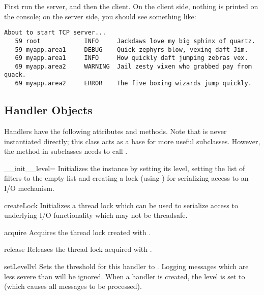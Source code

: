 First run the server, and then the client. On the client side, nothing is
printed on the console; on the server side, you should see something like:

\begin{verbatim}
About to start TCP server...
   59 root            INFO     Jackdaws love my big sphinx of quartz.
   59 myapp.area1     DEBUG    Quick zephyrs blow, vexing daft Jim.
   69 myapp.area1     INFO     How quickly daft jumping zebras vex.
   69 myapp.area2     WARNING  Jail zesty vixen who grabbed pay from quack.
   69 myapp.area2     ERROR    The five boxing wizards jump quickly.
\end{verbatim}

\subsection{Handler Objects}

Handlers have the following attributes and methods. Note that
 is never instantiated directly; this class acts as a
base for more useful subclasses. However, the 
method in subclasses needs to call .

\begin{methoddesc}{__init__}{level=}
Initializes the  instance by setting its level, setting
the list of filters to the empty list and creating a lock (using
) for serializing access to an I/O mechanism.
\end{methoddesc}

\begin{methoddesc}{createLock}{}
Initializes a thread lock which can be used to serialize access to
underlying I/O functionality which may not be threadsafe.
\end{methoddesc}

\begin{methoddesc}{acquire}{}
Acquires the thread lock created with .
\end{methoddesc}

\begin{methoddesc}{release}{}
Releases the thread lock acquired with .
\end{methoddesc}

\begin{methoddesc}{setLevel}{lvl}
Sets the threshold for this handler to . Logging messages which are
less severe than  will be ignored. When a handler is created, the
level is set to  (which causes all messages to be processed).
\end{methoddesc}

